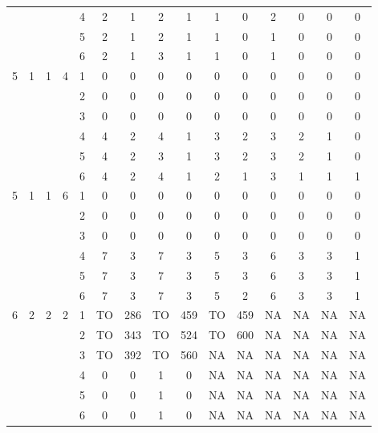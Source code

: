\begin{longtable}{|c|c|c|c|c|c c|c c|c c|c c|c c|}
 & & & & 4 & 2 & 1 & 2 & 1 & 1 & 0 & 2 & 0 & 0 & 0 \\
 & & & & 5 & 2 & 1 & 2 & 1 & 1 & 0 & 1 & 0 & 0 & 0 \\
 & & & & 6 & 2 & 1 & 3 & 1 & 1 & 0 & 1 & 0 & 0 & 0 \\
\hline
\multirow{6}{*}{5} & \multirow{6}{*}{1} & \multirow{6}{*}{1} & \multirow{6}{*}{4} & 1 & 0 & 0 & 0 & 0 & 0 & 0 & 0 & 0 & 0 & 0 \\
 & & & & 2 & 0 & 0 & 0 & 0 & 0 & 0 & 0 & 0 & 0 & 0 \\
 & & & & 3 & 0 & 0 & 0 & 0 & 0 & 0 & 0 & 0 & 0 & 0 \\
 & & & & 4 & 4 & 2 & 4 & 1 & 3 & 2 & 3 & 2 & 1 & 0 \\
 & & & & 5 & 4 & 2 & 3 & 1 & 3 & 2 & 3 & 2 & 1 & 0 \\
 & & & & 6 & 4 & 2 & 4 & 1 & 2 & 1 & 3 & 1 & 1 & 1 \\
\hline
\multirow{6}{*}{5} & \multirow{6}{*}{1} & \multirow{6}{*}{1} & \multirow{6}{*}{6} & 1 & 0 & 0 & 0 & 0 & 0 & 0 & 0 & 0 & 0 & 0 \\
 & & & & 2 & 0 & 0 & 0 & 0 & 0 & 0 & 0 & 0 & 0 & 0 \\
 & & & & 3 & 0 & 0 & 0 & 0 & 0 & 0 & 0 & 0 & 0 & 0 \\
 & & & & 4 & 7 & 3 & 7 & 3 & 5 & 3 & 6 & 3 & 3 & 1 \\
 & & & & 5 & 7 & 3 & 7 & 3 & 5 & 3 & 6 & 3 & 3 & 1 \\
 & & & & 6 & 7 & 3 & 7 & 3 & 5 & 2 & 6 & 3 & 3 & 1 \\
\hline
\multirow{6}{*}{6} & \multirow{6}{*}{2} & \multirow{6}{*}{2} & \multirow{6}{*}{2} & 1 & TO & 286 & TO & 459 & TO & 459 & NA & NA & NA & NA \\
 & & & & 2 & TO & 343 & TO & 524 & TO & 600 & NA & NA & NA & NA \\
 & & & & 3 & TO & 392 & TO & 560 & NA & NA & NA & NA & NA & NA \\
 & & & & 4 & 0 & 0 & 1 & 0 & NA & NA & NA & NA & NA & NA \\
 & & & & 5 & 0 & 0 & 1 & 0 & NA & NA & NA & NA & NA & NA \\
 & & & & 6 & 0 & 0 & 1 & 0 & NA & NA & NA & NA & NA & NA \\
\hline
\end{longtable}
